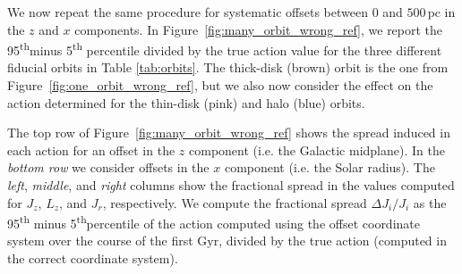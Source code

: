\documentclass[twocolumn]{aastex62}
\newcommand{\pc}{\text{pc}}
\newcommand{\Gyr}{\text{Gyr}}
\newcommand{\kms}{\text{km}/\text{s}}
\newcommand{\actunit}{\text{kpc}\,\kms}
\newcommand{\uth}{\textsuperscript{th}}
\newcommand{\thincolor}{pink}
\newcommand{\thickcolor}{brown}
\newcommand{\halocolor}{blue}
\begin{document}
\begin{figure*}
\caption{The artificial phase-dependence in the observed actions induced by an
error in the Galactocentric coordinate system. We consider here the thick-disk
orbit, which has actions of $(J_r, L_z, J_z) = (37.9, -1520, 7.0)\,\actunit$
and $z_{\text{max}}=850\,\pc$ (see Table~\ref{tab:orbits}). We integrate the
orbit according to the procedure laid out in Section~\ref{ssec:action_comp}.
Then, we subtract $100\,\pc$ from the $z$ value ({\em upper panels}) or the
$x$ value ({\em lower panels}) of each position in the orbit, corresponding to
an erroneous observer assuming a midplane ({\em upper}) or solar radius ({\em
lower}) that is off by $100\,\pc$. We then allow our (immortal) observer to
observe the orbit over $1\,\Gyr$ and perform the same orbit integration
procedure at each timestep, and report the values of the actions. The
computation of $L_z$ is pristine to errors in $z$, with only numerical
artifacts remaining. Only small errors are induced in $J_r$, with the middle
$90\%$ of values over the $\Gyr$ being within $\sim8\%$ of the true $J_r$. As
expected, large errors are induced in $J_z$ with a $100\,\pc$ offset in $z$,
with the middle $90\%$ of values being within $\sim43\%$ of the true $J_z$.
The $x$ offset induces uncertainties in $J_r$ and $L_z$ of $\sim21\%$ and
$\sim3\%$, respectively. A $\sim3\%$ error in $J_z$ is also induced.}
\label{fig:one_orbit_wrong_ref}
\end{figure*}

We now repeat the same procedure for systematic offsets between $0$ and
$500\,\pc$ in the $z$ and $x$ components. In
Figure~\ref{fig:many_orbit_wrong_ref}, we report the 95\uth minus 5\uth
percentile divided by the true action value for the three different fiducial
orbits in Table \ref{tab:orbits}. The thick-disk (\thickcolor) orbit is the
one from Figure~\ref{fig:one_orbit_wrong_ref}, but we also now consider the
effect on the action determined for the thin-disk (\thincolor) and halo
(\halocolor) orbits.

The top row of Figure~\ref{fig:many_orbit_wrong_ref} shows the spread induced
in each action for an offset in the $z$ component (i.e. the Galactic
midplane). In the {\em bottom row} we consider offsets in the $x$ component
(i.e. the Solar radius). The {\em left}, {\em middle}, and {\em right} columns
show the fractional spread in the values computed for $J_z$, $L_z$, and $J_r$,
respectively. We compute the fractional spread $\Delta J_i/J_i$ as the 95\uth
minus 5\uth percentile of the action computed using the offset coordinate
system over the course of the first $\Gyr$, divided by the true action
(computed in the correct coordinate system).
\end{document}
